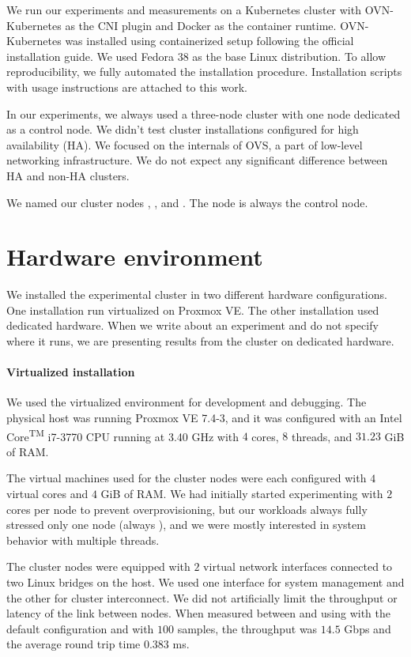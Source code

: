 We run our experiments and measurements on a Kubernetes cluster with OVN-Kubernetes as the CNI plugin and Docker as the container runtime. OVN-Kubernetes was installed using containerized setup following the official installation guide. We used Fedora 38 as the base Linux distribution. To allow reproducibility, we fully automated the installation procedure. Installation scripts with usage instructions are attached to this work.

In our experiments, we always used a three-node cluster with one node dedicated as a control node. We didn't test cluster installations configured for high availability (HA). We focused on the internals of OVS, a part of low-level networking infrastructure. We do not expect any significant difference between HA and non-HA clusters.

We named our cluster nodes , , and . The node  is always the control node.

\section{Hardware environment}
\label{sec:hw-env}

We installed the experimental cluster in two different hardware configurations. One installation run virtualized on Proxmox VE. The other installation used dedicated hardware. When we write about an experiment and do not specify where it runs, we are presenting results from the cluster on dedicated hardware.

\paragraph{Virtualized installation}
We used the virtualized environment for development and debugging. The physical host was running Proxmox VE 7.4-3, and it was configured with an Intel\textsuperscript{\textregistered} Core\textsuperscript{TM} i7-3770 CPU running at 3.40 GHz with $4$ cores, $8$ threads, and $31.23$ GiB of RAM.

The virtual machines used for the cluster nodes were each configured with $4$ virtual cores and $4$ GiB of RAM. We had initially started experimenting with $2$ cores per node to prevent overprovisioning, but our workloads always fully stressed only one node (always ), and we were mostly interested in system behavior with multiple threads.

The cluster nodes were equipped with $2$ virtual network interfaces connected to two Linux bridges on the host. We used one interface for system management and the other for cluster interconnect. We did not artificially limit the throughput or latency of the link between nodes. When measured between  and  using  with the default configuration and  with $100$ samples, the throughput was $14.5$ Gbps and the average round trip time $0.383$ ms.

